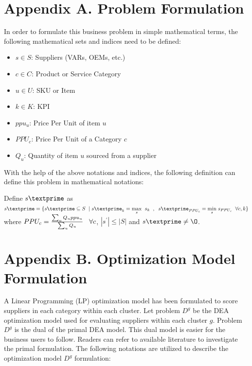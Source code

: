 \documentclass[inte,nonblindrev]{informs3} %
\begin{document}
\newpage
\begin{APPENDICES}
\section{Appendix A. Problem Formulation}
In order to formulate this business problem in simple mathematical terms, the following mathematical sets and indices need to be defined:
\begin{itemize}
\item[] $s \in {S}$: Suppliers (VARs, OEMs, etc.) 
\item[] $c \in {C}$: Product or Service Category	
\item[] $u \in {U}$: SKU or Item
\item[] $k \in {K}$: KPI
\item[] $ppu_{u}$: Price Per Unit of item $u$
\item[] $PPU_{c}$: Price Per Unit of a Category $c$
\item[] $Q_{u}$: Quantity of item $u$ sourced from a supplier
\end{itemize}

\vspace{0.25 in}

With the help of the above notations and indices, the following definition can define this problem in mathematical notations:

\begin{definition}
Define $s\textprime$ as $s\textprime = \{ s\textprime \subseteq S \hspace{2 mm} | \hspace{1 mm} s\textprime_{k} = \underset{s}{\mathrm{max}} \hspace{2 mm} s_{k} \hspace{2 mm}, \hspace{2 mm} s\textprime_{PPU_{c}} = \underset{s}{\mathrm{min}} \hspace{1 mm} s_{PPU_{c}} \hspace{2 mm} \forall c, k \} $ where $PPU_{c} = \frac{\sum_{u} Q_{u}{ppu_{u}}}{\sum_{u} Q_{u}} \hspace{3 mm} \forall c$, $ |s^{\prime}| \leq |S|$ and $s\textprime \neq \O $.
\end{definition}


\section{Appendix B. Optimization Model Formulation}
A Linear Programming (LP) optimization model has been formulated to score suppliers in each category within each cluster. Let problem $D^{g}$ be the DEA optimization model used for evaluating suppliers within each cluster $g$. Problem $D^{g}$ is the dual of the primal DEA model. This dual model is easier for the business users to follow. Readers can refer to available literature \citep{r12} to investigate the primal formulation. The following notations are utilized to describe the optimization model $D^{g}$ formulation:\\


\end{APPENDICES}
\end{document}
